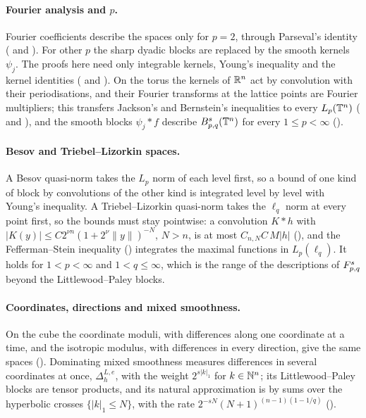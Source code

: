 \paragraph{Fourier analysis and $p$.} Fourier coefficients describe the spaces only for $p = 2$,
through Parseval's identity ( and ).
For other $p$ the sharp dyadic blocks are replaced by the smooth kernels $\psi_j$. The proofs here
need only integrable kernels, Young's inequality and the kernel identities
( and ). On the torus the kernels of $\mathbb{R}^n$ act by
convolution with their periodisations, and their Fourier transforms at the lattice points are
Fourier multipliers; this transfers Jackson's and Bernstein's inequalities to every $L_p(\mathbb{T}^n)$
( and ), and the smooth blocks $\psi_j * f$
describe $B^{s}_{p,q}(\mathbb{T}^n)$ for every $1 \leq p < \infty$ ().

\paragraph{Besov and Triebel--Lizorkin spaces.} A Besov quasi-norm takes the $L_p$ norm of each
level first, so a bound of one kind of block by convolutions of the other kind is integrated
level by level with Young's inequality. A Triebel--Lizorkin quasi-norm takes the $\ell_q$ norm
at every point first, so the bounds must stay pointwise: a convolution $K * h$ with
$|K(y)| \leq C 2^{\nu n} (1 + 2^\nu \|y\|)^{-N}$, $N > n$, is at most $C_{n,N} C \, M|h|$
(), and the Fefferman--Stein inequality
() integrates the maximal functions in $L_p(\ell_q)$. It holds for
$1 < p < \infty$ and $1 < q \leq \infty$, which is the range of the descriptions of
$F^{s}_{p,q}$ beyond the Littlewood--Paley blocks.

\paragraph{Coordinates, directions and mixed smoothness.} On the cube the coordinate moduli, with
differences along one coordinate at a time, and the isotropic modulus, with differences in every
direction, give the same spaces (). Dominating mixed smoothness measures
differences in several coordinates at once, $\Delta^{L,e}_h$, with the weight $2^{s|k|_1}$ for
$k \in \mathbb{N}^n$; its Littlewood--Paley blocks are tensor products, and its natural approximation is by
sums over the hyperbolic crosses $\{|k|_1 \leq N\}$, with the rate
$2^{-sN} (N + 1)^{(n-1)(1-1/q)}$ ().

